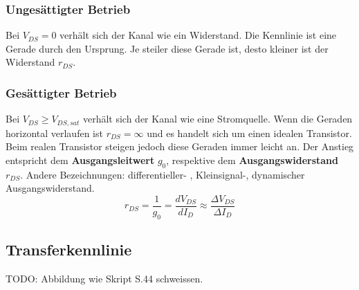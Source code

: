 \subsubsection{Ungesättigter Betrieb}
Bei $V_{DS} = 0$ verhält sich der Kanal wie ein Widerstand. Die Kennlinie ist eine Gerade durch den Ursprung. Je steiler diese Gerade ist, desto
kleiner ist der Widerstand $r_{DS}$.

\subsubsection{Gesättigter Betrieb}
Bei $V_{DS} \geq V_{DS,sat}$ verhält sich der Kanal wie eine Stromquelle. Wenn die Geraden horizontal verlaufen ist $r_{DS} = \infty$ und
es handelt sich um einen idealen Transistor. Beim realen Transistor steigen jedoch diese Geraden immer leicht an.
Der Anstieg entspricht dem \textbf{Ausgangsleitwert} $g_0$, respektive dem \textbf{Ausgangswiderstand} $r_{DS}$.
Andere Bezeichnungen: differentieller- , Kleinsignal-, dynamischer Ausgangswiderstand.
\[
	r_{DS} = \frac{1}{g_0} = \frac{dV_{DS}}{dI_{D}} \approx \frac{\Delta V_{DS}}{\Delta I_D}
\]


\subsection{Transferkennlinie}

TODO: Abbildung wie Skript S.44 schweissen.

